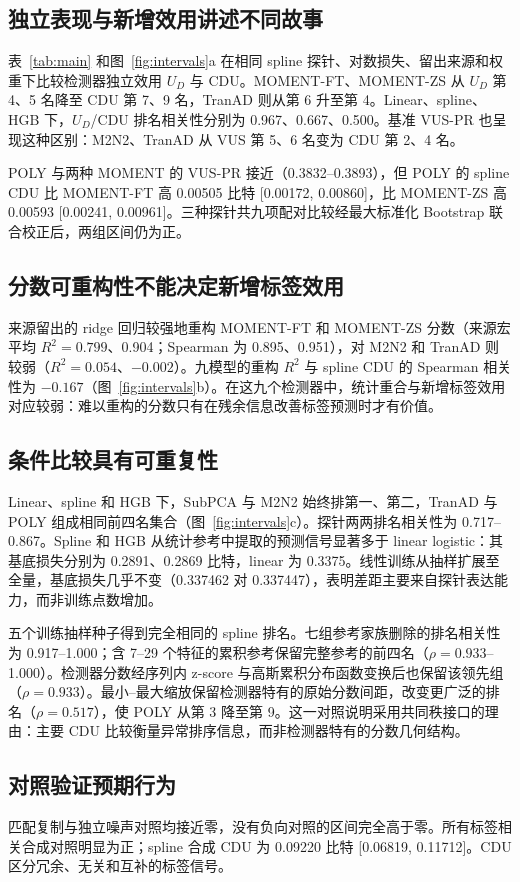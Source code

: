 \subsection{独立表现与新增效用讲述不同故事}
表~\ref{tab:main} 和图~\ref{fig:intervals}a 在相同 spline 探针、对数损失、留出来源和权重下比较检测器独立效用 $U_D$ 与 CDU。MOMENT-FT、MOMENT-ZS 从 $U_D$ 第 4、5 名降至 CDU 第 7、9 名，TranAD 则从第 6 升至第 4。Linear、spline、HGB 下，$U_D$/CDU 排名相关性分别为 0.967、0.667、0.500。基准 VUS-PR 也呈现这种区别：M2N2、TranAD 从 VUS 第 5、6 名变为 CDU 第 2、4 名。

POLY 与两种 MOMENT 的 VUS-PR 接近（0.3832--0.3893），但 POLY 的 spline CDU 比 MOMENT-FT 高 0.00505 比特 [0.00172, 0.00860]，比 MOMENT-ZS 高 0.00593 [0.00241, 0.00961]。三种探针共九项配对比较经最大标准化 Bootstrap 联合校正后，两组区间仍为正。

\subsection{分数可重构性不能决定新增标签效用}
来源留出的 ridge 回归较强地重构 MOMENT-FT 和 MOMENT-ZS 分数（来源宏平均 $R^2=0.799$、0.904；Spearman 为 0.895、0.951），对 M2N2 和 TranAD 则较弱（$R^2=0.054$、$-0.002$）。九模型的重构 $R^2$ 与 spline CDU 的 Spearman 相关性为 $-0.167$（图~\ref{fig:intervals}b）。在这九个检测器中，统计重合与新增标签效用对应较弱：难以重构的分数只有在残余信息改善标签预测时才有价值。

\subsection{条件比较具有可重复性}
Linear、spline 和 HGB 下，SubPCA 与 M2N2 始终排第一、第二，TranAD 与 POLY 组成相同前四名集合（图~\ref{fig:intervals}c）。探针两两排名相关性为 0.717--0.867。Spline 和 HGB 从统计参考中提取的预测信号显著多于 linear logistic：其基底损失分别为 0.2891、0.2869 比特，linear 为 0.3375。线性训练从抽样扩展至全量，基底损失几乎不变（0.337462 对 0.337447），表明差距主要来自探针表达能力，而非训练点数增加。

五个训练抽样种子得到完全相同的 spline 排名。七组参考家族删除的排名相关性为 0.917--1.000；含 7--29 个特征的累积参考保留完整参考的前四名（$\rho=0.933$--1.000）。检测器分数经序列内 z-score 与高斯累积分布函数变换后也保留该领先组（$\rho=0.933$）。最小--最大缩放保留检测器特有的原始分数间距，改变更广泛的排名（$\rho=0.517$），使 POLY 从第 3 降至第 9。这一对照说明采用共同秩接口的理由：主要 CDU 比较衡量异常排序信息，而非检测器特有的分数几何结构。

\subsection{对照验证预期行为}
匹配复制与独立噪声对照均接近零，没有负向对照的区间完全高于零。所有标签相关合成对照明显为正；spline 合成 CDU 为 0.09220 比特 [0.06819, 0.11712]。CDU 区分冗余、无关和互补的标签信号。
